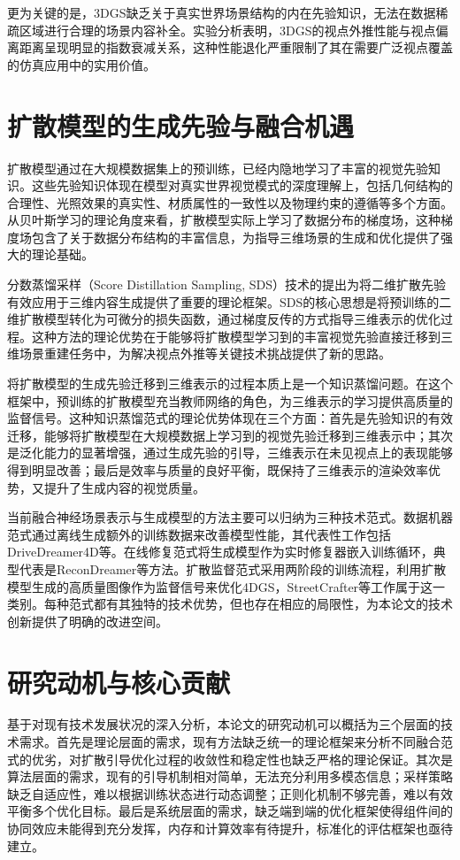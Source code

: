 更为关键的是，3DGS缺乏关于真实世界场景结构的内在先验知识，无法在数据稀疏区域进行合理的场景内容补全。实验分析表明，3DGS的视点外推性能与视点偏离距离呈现明显的指数衰减关系，这种性能退化严重限制了其在需要广泛视点覆盖的仿真应用中的实用价值。

\section{扩散模型的生成先验与融合机遇}

扩散模型通过在大规模数据集上的预训练，已经内隐地学习了丰富的视觉先验知识\cite{ho2020denoising}。这些先验知识体现在模型对真实世界视觉模式的深度理解上，包括几何结构的合理性、光照效果的真实性、材质属性的一致性以及物理约束的遵循等多个方面。从贝叶斯学习的理论角度来看，扩散模型实际上学习了数据分布的梯度场，这种梯度场包含了关于数据分布结构的丰富信息，为指导三维场景的生成和优化提供了强大的理论基础。

分数蒸馏采样（Score Distillation Sampling, SDS）技术的提出为将二维扩散先验有效应用于三维内容生成提供了重要的理论框架\cite{dreamfusion2022}。SDS的核心思想是将预训练的二维扩散模型转化为可微分的损失函数，通过梯度反传的方式指导三维表示的优化过程。这种方法的理论优势在于能够将扩散模型学习到的丰富视觉先验直接迁移到三维场景重建任务中，为解决视点外推等关键技术挑战提供了新的思路。

将扩散模型的生成先验迁移到三维表示的过程本质上是一个知识蒸馏问题。在这个框架中，预训练的扩散模型充当教师网络的角色，为三维表示的学习提供高质量的监督信号。这种知识蒸馏范式的理论优势体现在三个方面：首先是先验知识的有效迁移，能够将扩散模型在大规模数据上学习到的视觉先验迁移到三维表示中；其次是泛化能力的显著增强，通过生成先验的引导，三维表示在未见视点上的表现能够得到明显改善；最后是效率与质量的良好平衡，既保持了三维表示的渲染效率优势，又提升了生成内容的视觉质量。

当前融合神经场景表示与生成模型的方法主要可以归纳为三种技术范式。数据机器范式通过离线生成额外的训练数据来改善模型性能，其代表性工作包括DriveDreamer4D等。在线修复范式将生成模型作为实时修复器嵌入训练循环，典型代表是ReconDreamer等方法。扩散监督范式采用两阶段的训练流程，利用扩散模型生成的高质量图像作为监督信号来优化4DGS，StreetCrafter等工作属于这一类别。每种范式都有其独特的技术优势，但也存在相应的局限性，为本论文的技术创新提供了明确的改进空间。

\section{研究动机与核心贡献}

基于对现有技术发展状况的深入分析，本论文的研究动机可以概括为三个层面的技术需求。首先是理论层面的需求，现有方法缺乏统一的理论框架来分析不同融合范式的优劣，对扩散引导优化过程的收敛性和稳定性也缺乏严格的理论保证。其次是算法层面的需求，现有的引导机制相对简单，无法充分利用多模态信息；采样策略缺乏自适应性，难以根据训练状态进行动态调整；正则化机制不够完善，难以有效平衡多个优化目标。最后是系统层面的需求，缺乏端到端的优化框架使得组件间的协同效应未能得到充分发挥，内存和计算效率有待提升，标准化的评估框架也亟待建立。

